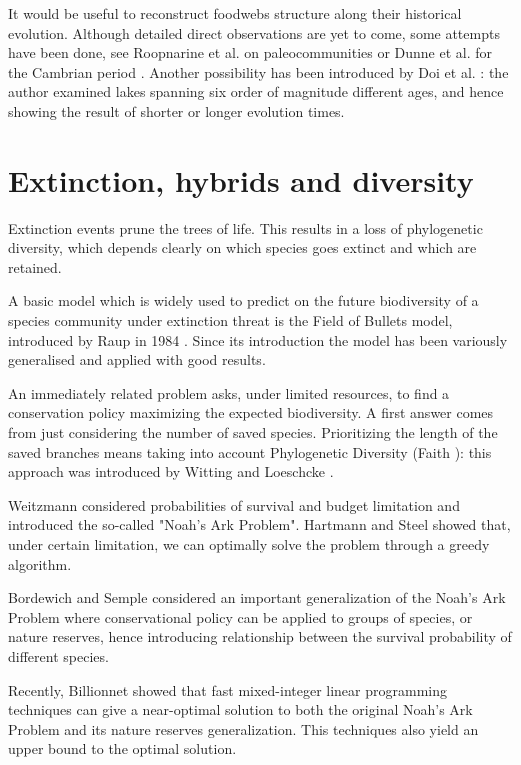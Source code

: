 \documentclass[12pt,a4paper]{report}
\begin{document}
It would be useful to reconstruct foodwebs structure along their historical evolution. Although detailed direct observations are yet to come, some attempts have been done, see Roopnarine et al. on paleocommunities \cite{roopnarine_networks_2010, roopnarine_red_2012} or Dunne et al. for the Cambrian period \cite{dunne_compilation_2008}. Another possibility has been introduced by Doi et al. \cite{doi_shorter_2012}: the author examined lakes spanning six order of magnitude different ages, and hence showing the result of shorter or longer evolution times.

\section{Extinction, hybrids and diversity}
Extinction events prune the trees of life. This results in a loss of phylogenetic diversity, which depends clearly on which species goes extinct and which are retained.

A basic model which is widely used to predict on the future biodiversity of a species community under extinction threat is the Field of Bullets model, introduced by Raup in 1984 \cite{raup1984evolutionary}. Since its introduction the model has been variously generalised and applied with good results.

An immediately related problem asks, under limited resources, to find a conservation policy maximizing the expected biodiversity. A first answer comes from just considering the number of saved species. Prioritizing the length of the saved branches means taking into account Phylogenetic Diversity (Faith \cite{faith1992conservation}): this approach was introduced by Witting and Loeschcke \cite{witting1995optimization}.

Weitzmann \cite{weitzman1998noah} considered probabilities of survival and budget limitation and introduced the so-called "Noah's Ark Problem". Hartmann and Steel \cite{hartmann2006maximizing} showed that, under certain limitation, we can optimally solve the problem through a greedy algorithm.

Bordewich and Semple \cite{bordewich2008nature} considered an important generalization of the Noah's Ark Problem where conservational policy can be applied to groups of species, or nature reserves, hence introducing relationship between the survival probability of different species.

Recently, Billionnet \cite{Billionnet01012013} showed that fast mixed-integer linear programming techniques can give a near-optimal solution to both the original Noah's Ark Problem and its nature reserves generalization. This techniques also yield an upper bound to the optimal solution.
\end{document}
